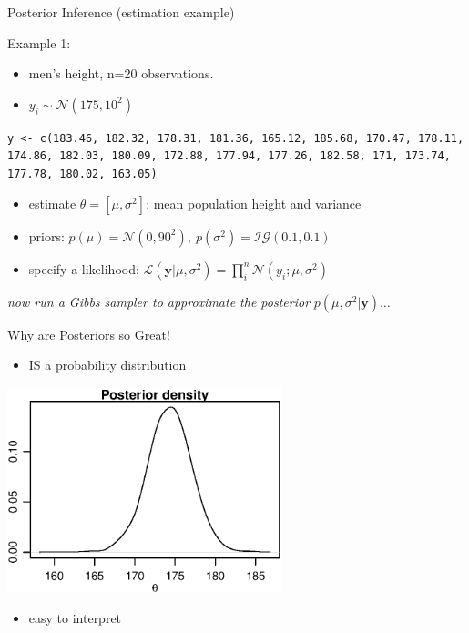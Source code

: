 \documentclass[presentation,9pt,xcolor=dvipsnames]{beamer}
\begin{document}
\begin{frame}[fragile,label={sec:org99d87a1}]{Posterior Inference (estimation example)}
 \begin{block}{Example 1:}
\begin{itemize}
\item men's height, n=20 observations.
\item \(y_i\sim\mathcal{N}(175,10^2)\)
\end{itemize}
\texttt{y <- c(183.46, 182.32, 178.31, 181.36, 165.12, 185.68, 170.47, 178.11, 174.86, 182.03, 180.09, 172.88, 177.94, 177.26, 182.58, 171, 173.74, 177.78, 180.02, 163.05)}
\begin{itemize}
\item estimate \(\theta=[\mu,\sigma^2]\): mean population height and variance
\item priors:  \(p(\mu)=\mathcal{N}(0,90^2),\ p(\sigma^2)=\mathcal{IG}(0.1,0.1)\)
\item specify a likelihood: \(\mathcal{L}(\mathbf{y}\vert\mu,\sigma^2)=\prod_i^n\mathcal{N}(y_i; \mu,\sigma^2)\)
\end{itemize}
\end{block}
\begin{block}{\emph{now run a Gibbs sampler to approximate the posterior} \(p(\mu,\sigma^2\vert \mathbf{y})\dots\)}
\end{block}
\end{frame}
\begin{frame}[label={sec:orgc29f4e8}]{Why are Posteriors so Great!}
\begin{itemize}
\item IS a probability distribution
\end{itemize}
\begin{center}
\includegraphics[width=0.6\textwidth,height=0.6\textheight]{posterior1.eps}
\end{center}
\begin{itemize}
\item easy to interpret
\end{itemize}
\end{frame}
\end{document}
